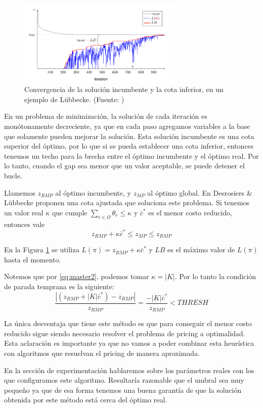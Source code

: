 \begin{figure}[H]
\centering
\includegraphics[width=0.7\textwidth]{img/Screenshot from 2023-10-11 00-03-23.png}
\caption{Convergencia de la solución incumbente y la cota inferior, en un ejemplo de Lübbecke. (Fuente: \cite{co-at-work-luebbecke})}
\label{fig:bound-convergence}
\centering
\end{figure}

En un problema de minimización, la solución de cada iteración es monótonamente decreciente, ya que en cada paso agregamos variables a la base que solamente pueden mejorar la solución. Esta solución incumbente es una cota superior del óptimo, por lo que si se pueda establecer una cota inferior, entonces tenemos un techo para la brecha entre el óptimo incumbente y el óptimo real. Por lo tanto, cuando el gap sea menor que un valor aceptable, se puede detener el bucle.

Llamemos $z_{RMP}$ al óptimo incumbente, y $z_{MP}$ al óptimo global. En \cite{desrosiers2005primer} Desrosiers \& Lübbecke proponen una cota ajustada que soluciona este problema. Si tenemos un valor real $\kappa$ que cumple $\sum_{r \in \Omega}{\theta_r} \leq \kappa$ y $\bar{c}^{*}$ es el menor costo reducido, entonces vale
\begin{equation}
    z_{RMP} + \kappa \bar{c}^{*} \leq z_{MP} \leq z_{RMP}
\end{equation}

En la Figura \ref{fig:bound-convergence} se utiliza $L(\pi) = z_{RMP} + \kappa \bar{c}^{*}$ y $LB$ es el máximo valor de $L(\pi)$ hasta el momento.

Notemos que por \ref{eq:master2}, podemos tomar $\kappa = |K|$. Por lo tanto la condición de parada temprana es la siguiente:
\begin{equation}
     \frac{|(z_{RMP} + |K| \bar{c}^{*}) - z_{RMP}|}{z_{RMP}} = \frac{-|K| \bar{c}^{*}}{z_{RMP}}  < THRESH
\end{equation}

La única desventaja que tiene este método es que para conseguir el menor costo reducido sigue siendo necesario resolver el problema de pricing a optimalidad. Esta aclaración es importante ya que no vamos a poder combinar esta heurística con algoritmos que resuelvan el pricing de manera aproximada.

En la sección de experimentación hablaremos sobre los parámetros reales con los que configuramos este algoritmo. Resultaría razonable que el umbral sea muy pequeño ya que de esa forma tenemos una buena garantía de que la solución obtenida por este método está cerca del óptimo real.
